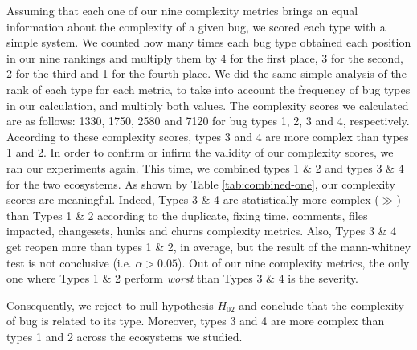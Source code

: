 Assuming that each one of our nine complexity metrics brings an equal information about the complexity of a given bug, we scored each type with a simple system.
We counted how many times each bug type obtained each position in our nine rankings and multiply them by 4 for the first place, 3 for the second, 2 for the third and 1 for the fourth place.
We did the same simple analysis of the rank of each type for each metric, to take into account the frequency of bug types in our calculation, and multiply both values.
The complexity scores we calculated are as follows: 1330, 1750, 2580 and 7120 for bug types 1, 2, 3 and 4, respectively.
According to these complexity scores, types 3 and 4 are more complex than types 1 and 2.
In order to confirm or infirm the validity of our complexity scores, we ran our experiments again.
This time, we combined types 1 \& 2 and types 3 \& 4 for the two ecosystems.
As shown by Table \ref{tab:combined-one}, our complexity scores are meaningful.
Indeed, Types 3 \& 4 are statistically more complex ($\gg$) than Types 1 \& 2 according to the duplicate, fixing time, comments, files impacted, changesets, hunks and churns complexity metrics.
Also, Types 3 \& 4 get reopen more than  types 1 \& 2, in average, but the result of the mann-whitney test is not conclusive (i.e. $\alpha>0.05$).
Out of our nine complexity metrics, the only one where Types 1 \& 2 perform {\it worst} than Types 3 \& 4 is the severity.

Consequently, we reject to null hypothesis $H_{02}$ and conclude that the complexity of bug is related to its type.
Moreover, types 3 and 4 are more complex than types 1 and 2 across the ecosystems we studied.
